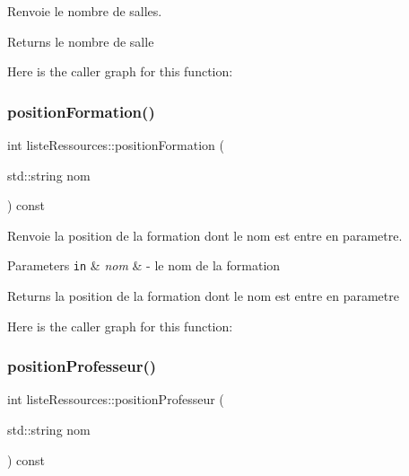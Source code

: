 Renvoie le nombre de salles. 

\begin{DoxyReturn}{Returns}
le nombre de salle 
\end{DoxyReturn}
Here is the caller graph for this function\+:
\hypertarget{classliste_ressources_a1649d1144f57339c52731acf2d5cfa51}{}\label{classliste_ressources_a1649d1144f57339c52731acf2d5cfa51} 
\subsubsection{\texorpdfstring{position\+Formation()}{positionFormation()}}
{\footnotesize\ttfamily int liste\+Ressources\+::position\+Formation (\begin{DoxyParamCaption}\item[{std\+::string}]{nom }\end{DoxyParamCaption}) const}



Renvoie la position de la formation dont le nom est entre en parametre. 


\begin{DoxyParams}[1]{Parameters}
\mbox{\tt in}  & {\em nom} & -\/ le nom de la formation \\
\hline
\end{DoxyParams}
\begin{DoxyReturn}{Returns}
la position de la formation dont le nom est entre en parametre 
\end{DoxyReturn}
Here is the caller graph for this function\+:
\hypertarget{classliste_ressources_a1d7b514a5f879849283a5326bd102d9c}{}\label{classliste_ressources_a1d7b514a5f879849283a5326bd102d9c} 
\subsubsection{\texorpdfstring{position\+Professeur()}{positionProfesseur()}}
{\footnotesize\ttfamily int liste\+Ressources\+::position\+Professeur (\begin{DoxyParamCaption}\item[{std\+::string}]{nom }\end{DoxyParamCaption}) const}



